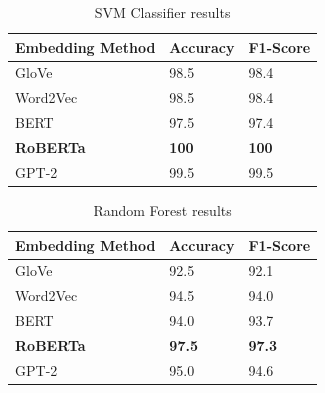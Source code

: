 \begin{table}[hbt!]
\begin{threeparttable}
\caption{SVM Classifier results}
\label{svc_results}
\begin{tabular}{lll}
\toprule
\headrow Embedding Method & Accuracy & F1-Score\\
\midrule
 GloVe    &       98.5 &       98.4 \\
 Word2Vec &       98.5 &       98.4 \\
 BERT     &       97.5 &       97.4 \\
 \textbf{RoBERTa}  &       \textbf{100} &       \textbf{100} \\
 GPT-2    &       99.5 &       99.5 \\
\bottomrule
\end{tabular}
\end{threeparttable}
\end{table}

\begin{table}[hbt!]
\begin{threeparttable}
\caption{Random Forest results}
\label{rf_results}
\begin{tabular}{lll}
\toprule
\headrow Embedding Method & Accuracy & F1-Score\\
\midrule
 GloVe    &       92.5 &       92.1 \\
 Word2Vec &       94.5 &       94.0 \\
 BERT     &       94.0 &       93.7 \\
 \textbf{RoBERTa}  &       \textbf{97.5} &       \textbf{97.3} \\
 GPT-2    &       95.0 &       94.6 \\
\bottomrule
\end{tabular}
\end{threeparttable}
\end{table}

